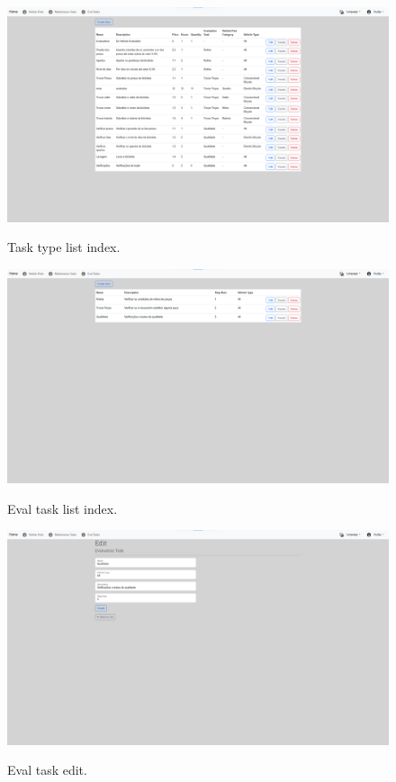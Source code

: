 \begin{figure}[htbp]
  \caption{Task type list index.}
  \centering
  \includegraphics[width=\textwidth]{figs/Implementation/dealershipAdmin/taskIndex}
  \label{fig:taskIndex}
\end{figure}

\clearpage

\begin{figure}[htbp]
  \caption{Eval task list index.}
  \centering
  \includegraphics[width=\textwidth]{figs/Implementation/dealershipAdmin/evalIndex}
  \label{fig:evalIndex}
\end{figure}
 
\begin{figure}[htbp] 
  \caption{Eval task edit.}
  \centering
  \includegraphics[width=\textwidth]{figs/Implementation/dealershipAdmin/evalEdit}
  \label{fig:evalEdit} 
\end{figure}


